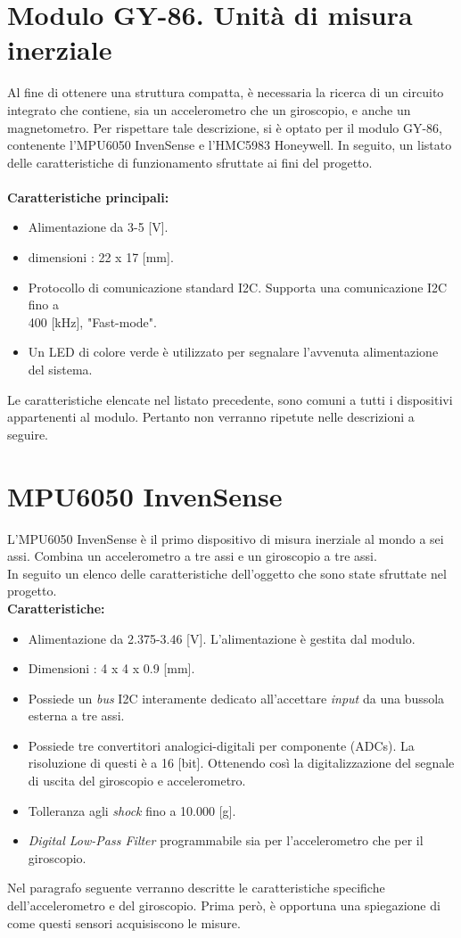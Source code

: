 \documentclass[11pt]{report}
\begin{document}
\section{Modulo GY-86. Unità di misura inerziale}
Al fine di ottenere una struttura compatta, è necessaria la ricerca di un circuito integrato che contiene, sia un accelerometro che un giroscopio, e anche un magnetometro. Per rispettare tale descrizione, si è optato per il modulo GY-86, contenente l'MPU6050 InvenSense e l'HMC5983 Honeywell.
In seguito, un listato delle caratteristiche di funzionamento sfruttate ai fini del progetto.\\\\
\textbf{Caratteristiche principali:}
\begin{itemize}
\item Alimentazione da 3-5 [V].
\item dimensioni : 22 x 17 [mm].
\item Protocollo di comunicazione standard I2C. Supporta una comunicazione I2C fino a\\400 [kHz], "Fast-mode".
\item Un LED di colore verde è utilizzato per segnalare l'avvenuta alimentazione del sistema.
\end{itemize}
Le caratteristiche elencate nel listato precedente, sono comuni a tutti i dispositivi appartenenti al modulo. Pertanto non verranno ripetute nelle descrizioni a seguire. 
    \section{MPU6050 InvenSense}
    L'MPU6050 InvenSense è il primo dispositivo di misura inerziale al mondo a sei assi. Combina un accelerometro a tre assi e un giroscopio a tre assi.\\
    In seguito un elenco delle caratteristiche dell'oggetto che sono state sfruttate nel progetto.\\
    \textbf{Caratteristiche:}
    \begin{itemize}
    \item Alimentazione da 2.375-3.46 [V]. L'alimentazione è gestita dal modulo.
    \item Dimensioni : 4 x 4 x 0.9 [mm].
    \item Possiede un \textit{bus} I2C interamente dedicato all'accettare \textit{input} da una bussola esterna a  tre assi.  
    \item Possiede tre convertitori analogici-digitali per componente (ADCs). La risoluzione di questi è a 16 [bit]. Ottenendo così la digitalizzazione del segnale di uscita del giroscopio e accelerometro.
    \item Tolleranza agli \textit{shock} fino a 10.000 [g]. %
    \item \textit{Digital Low-Pass Filter} programmabile sia per l'accelerometro che per il giroscopio.
    \end{itemize}
Nel paragrafo seguente verranno descritte le caratteristiche specifiche dell'accelerometro e del giroscopio. Prima però, è opportuna una spiegazione di come questi sensori acquisiscono le misure.
\end{document}

